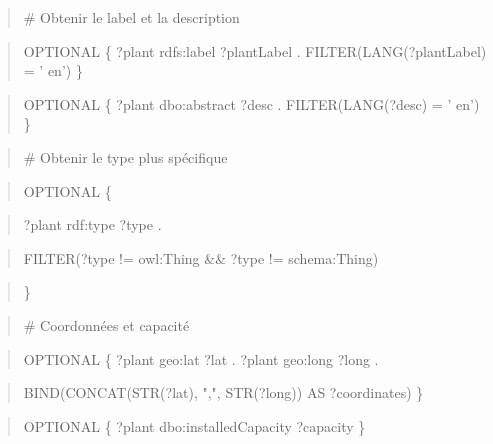 \documentclass[a4paper,11pt]{report}
\begin{document}
\begin{quote}
\end{quote}

\begin{quote}
\# Obtenir le label et la description
\end{quote}

\begin{quote}
OPTIONAL \{ ?plant rdfs:label ?plantLabel . FILTER(LANG(?plantLabel) = ' en') \}
\end{quote}

\begin{quote}
OPTIONAL \{ ?plant dbo:abstract ?desc . FILTER(LANG(?desc) = ' en') \}
\end{quote}

\begin{quote}
\end{quote}

\begin{quote}
\# Obtenir le type plus spécifique
\end{quote}

\begin{quote}
OPTIONAL \{
\end{quote}

\begin{quote}
?plant rdf:type ?type .
\end{quote}

\begin{quote}
FILTER(?type != owl:Thing \&\& ?type != schema:Thing)
\end{quote}

\begin{quote}
\}
\end{quote}

\begin{quote}
\end{quote}

\begin{quote}
\# Coordonnées et capacité
\end{quote}

\begin{quote}
OPTIONAL \{ ?plant geo:lat ?lat . ?plant geo:long ?long .
\end{quote}

\begin{quote}
BIND(CONCAT(STR(?lat), ",", STR(?long)) AS ?coordinates) \}
\end{quote}

\begin{quote}
OPTIONAL \{ ?plant dbo:installedCapacity ?capacity \}
\end{quote}
\end{document}
